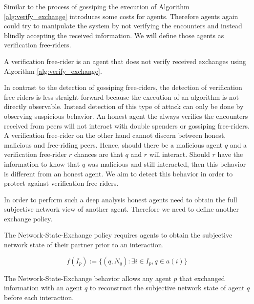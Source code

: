 Similar to the process of gossiping the execution of Algorithm \ref{alg:verify_exchange} introduces
some costs for agents. Therefore agents again could try to manipulate the system by not verifying 
the encounters and instead blindly accepting the received information. We will define those agents
as verification free-riders.

\begin{defn}
    A verification free-rider is an agent that does not verify received exchanges using Algorithm 
    \ref{alg:verify_exchange}.
\end{defn}

In contrast to the detection of gossiping free-riders, the detection of verification free-riders is
less straight-forward because the execution of an algorithm is not directly observable. Instead 
detection of this type of attack can only be done by observing suspicious behavior. An honest agent
the always verifies the encounters received from peers will not interact with double spenders or 
gossiping free-riders. A verification free-rider on the other hand cannot discern between honest,
malicious and free-riding peers. Hence, should there be a malicious agent $q$ and a verification 
free-rider $r$ chances are that $q$ and $r$ will interact. Should $r$ have the information to know 
that $q$ was malicious and still interacted, then this behavior is different from an honest agent.
We aim to detect this behavior in order to protect against verification free-riders.

In order to perform such a deep analysis honest agents need to obtain the full subjective network 
view of another agent. Therefore we need to define another exchange policy.

\begin{pol}
    \label{pol:network_state}
    The Network-State-Exchange policy requires agents to obtain the subjective network state of their partner 
    prior to an interaction. 

    \[ f(I_p) := \{ (q, N_q) : \exists i \in I_p, q \in a(i) \}\]
\end{pol}

The Network-State-Exchange behavior allows any agent $p$ that exchanged information with an agent $q$
to reconstruct the subjective network state of agent $q$ before each interaction. 



